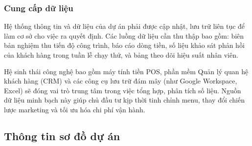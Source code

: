 \documentclass[a4paper,12pt]{article}
\begin{document}
\subsubsection{Cung cấp dữ liệu}
Hệ thống thông tin và dữ liệu của dự án phải được cập nhật, lưu trữ liên tục để làm cơ sở cho việc ra quyết định. Các luồng dữ liệu cần thu thập bao gồm: biên bản nghiệm thu tiến độ công trình, báo cáo dòng tiền, số liệu khảo sát phản hồi của khách hàng trong tuần lễ chạy thử, và bảng theo dõi hiệu suất nhân viên.

Hệ sinh thái công nghệ bao gồm máy tính tiền POS, phần mềm Quản lý quan hệ khách hàng (CRM) và các công cụ lưu trữ đám mây (như Google Workspace, Excel) sẽ đóng vai trò trung tâm trong việc tổng hợp, phân tích số liệu. Nguồn dữ liệu minh bạch này giúp chủ đầu tư kịp thời tinh chỉnh menu, thay đổi chiến lược marketing và tối ưu hóa chi phí vận hành.

\subsection{Thông tin sơ đồ dự án}


\begingroup
\renewcommand{\arraystretch}{1.5}
\setlength{\tabcolsep}{6pt}
\setlength{\LTpre}{0pt}
\setlength{\LTpost}{0pt}
\end{document}
